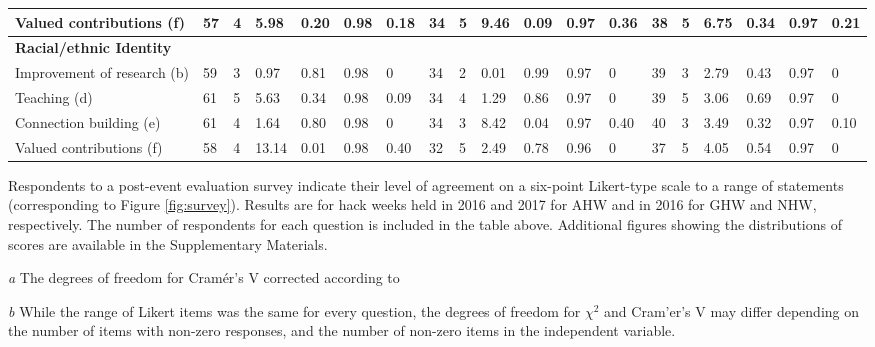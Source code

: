 \begin{table}
\begin{threeparttable}
\begin{tabularx}{18cm}{p{3.4cm}p{0.3cm}p{0.33cm}p{0.33cm}p{0.33cm}p{0.33cm}p{0.33cm}p{0.33cm}p{0.33cm}p{0.33cm}p{0.33cm}p{0.33cm}p{0.33cm}p{0.33cm}p{0.33cm}p{0.33cm}p{0.33cm}p{0.33cm}p{0.33cm}}
Valued contributions (f) & 57 & 4 & 5.98 & 0.20 & 0.98 & 0.18 & 34 & 5 & 9.46 & 0.09 & 0.97 & 0.36 & 38 & 5 & 6.75 & 0.34 & 0.97 & 0.21 \\ \midrule
\multicolumn{16}{l}{\textbf{Racial/ethnic Identity}} \\ \midrule
Improvement of research (b)  & 59 & 3 & 0.97 & 0.81 & 0.98 & 0 & 34 &2 & 0.01 & 0.99 & 0.97 & 0 & 39 & 3 & 2.79 & 0.43 & 0.97 & 0 \\
Teaching (d) & 61 & 5 & 5.63 & 0.34 & 0.98 & 0.09 & 34 & 4 & 1.29 & 0.86 & 0.97 & 0 & 39 & 5 & 3.06 & 0.69 & 0.97 & 0 \\
Connection building (e) & 61 & 4 & 1.64 & 0.80 & 0.98 & 0 & 34 & 3 & 8.42 & 0.04 & 0.97 & 0.40 & 40 & 3 & 3.49 & 0.32 & 0.97 & 0.10 \\
Valued contributions (f) & 58 & 4 & 13.14 & 0.01 & 0.98 & 0.40 & 32 & 5 & 2.49 & 0.78 & 0.96 & 0 & 37 & 5 & 4.05 & 0.54 & 0.97 & 0 \\ 
\bottomrule
\end{tabularx}
   \begin{tablenotes}
      \item{Respondents to a post-event evaluation survey indicate their level of agreement on a six-point Likert-type scale to a range of statements (corresponding to Figure \ref{fig:survey}). Results are for hack weeks held in 2016 and 2017 for AHW and in 2016 for GHW and NHW, respectively. The number of respondents for each question is included in the table above. Additional figures showing the distributions of scores are available in the Supplementary Materials.}
      \item[\emph{a}]{The degrees of freedom for Cram\'{e}r's V corrected according to~\citep{bergsma2013}}
      \item[\emph{b}]{While the range of Likert items was the same for every question, the degrees of freedom for $\chi^2$ and Cram'{e}r's V may differ depending on the number of items with non-zero responses, and the number of non-zero items in the independent variable.}

\end{tablenotes}

\end{threeparttable}
\label{tab:priors}
\end{table}

